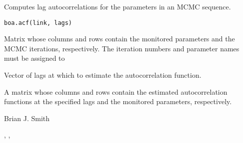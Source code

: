 \begin{Description}\relax
Computes lag autocorrelations for the parameters in an MCMC sequence.
\end{Description}
\begin{Usage}
\begin{verbatim}
boa.acf(link, lags)
\end{verbatim}
\end{Usage}
\begin{Arguments}
\begin{ldescription}
\item[\code{link}] Matrix whose columns and rows contain the monitored parameters
and the MCMC iterations, respectively. The iteration numbers and parameter
names must be assigned to 
\item[\code{lags}] Vector of lags at which to estimate the autocorrelation function.
\end{ldescription}
\end{Arguments}
\begin{Value}
A matrix whose columns and rows contain the estimated autocorrelation
functions at the specified lags and the monitored parameters, respectively.
\end{Value}
\begin{Author}\relax
Brian J. Smith
\end{Author}
\begin{SeeAlso}\relax
{}, ,
\end{SeeAlso}

